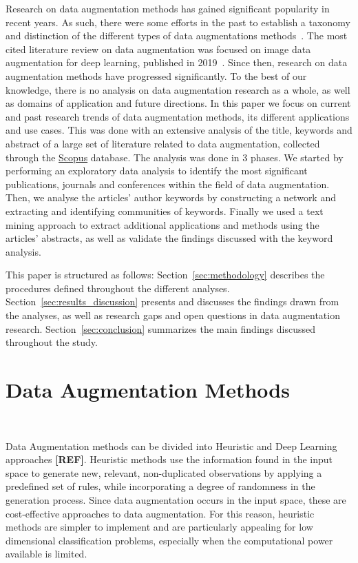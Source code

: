 \documentclass[parskip=full]{scrartcl}
\begin{document}
Research on data augmentation methods has gained significant popularity in
recent years. As such, there were some efforts in the past to establish a
taxonomy and distinction of the different types of data augmentations
methods~\cite{Shorten2019}. The most cited literature review on data
augmentation was focused on image data augmentation for deep learning,
published in 2019~\cite{Shorten2019}. Since then, research on data
augmentation methods have progressed significantly. To the best of our
knowledge, there is no analysis on data augmentation research as a whole, as
well as domains of application and future directions. In this paper we focus
on current and past research trends of data augmentation methods, its
different applications and use cases. This was done with an extensive analysis
of the title, keywords and abstract of a large set of literature related to
data augmentation, collected through the
\href{https://www.scopus.com/}{Scopus} database. The analysis was done in 3
phases. We started by performing an exploratory data analysis to identify the
most significant publications, journals and conferences within the field of
data augmentation. Then, we analyse the articles' author keywords by
constructing a network and extracting and identifying communities of keywords.
Finally we used a text mining approach to extract additional applications and
methods using the articles' abstracts, as well as validate the findings
discussed with the keyword analysis.

This paper is structured as follows: Section~\ref{sec:methodology} describes
the procedures defined throughout the different analyses.
Section~\ref{sec:results_discussion} presents and discusses the findings drawn
from the analyses, as well as research gaps and open questions in data
augmentation research. Section~\ref{sec:conclusion} summarizes the main
findings discussed throughout the study.

\section{Data Augmentation Methods}~\label{sec:data-augmentation}
 
Data Augmentation methods can be divided into Heuristic and Deep Learning
approaches \textbf{[REF]}. Heuristic methods use the information found in the
input space to generate new, relevant, non-duplicated observations by applying
a predefined set of rules, while incorporating a degree of randomness in the
generation process. Since data augmentation occurs in the input space, these
are cost-effective approaches to data augmentation. For this reason, heuristic
methods are simpler to implement and are particularly appealing for low
dimensional classification problems, especially when the computational power
available is limited. 
\end{document}

